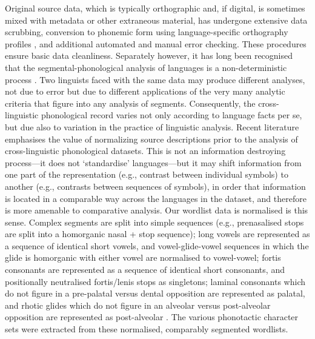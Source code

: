 Original source data, which is typically orthographic and, if digital, is sometimes mixed with metadata or other extraneous material, has undergone extensive data scrubbing, conversion to phonemic form using language-specific orthography profiles \autocite{moran_unicode_2018}, and additional automated and manual error checking. These procedures ensure basic data cleanliness. Separately however, it has long been recognised that the segmental-phonological analysis of languages is a non-deterministic process \autocites{chao_non-uniqueness_1934}{hockett_problem_1963}{hyman_universals_2008}{dresher_contrastive_2009}. Two linguists faced with the same data may produce different analyses, not due to error but due to different applications of the very many analytic criteria that figure into any analysis of segments. Consequently, the cross-linguistic phonological record varies not only according to language facts per se, but due also to variation in the practice of linguistic analysis. Recent literature \autocites{lass_vowel_1984}{hyman_universals_2008}{van_der_hulst_phonological_2017}{round_matthew_2017}{kiparsky_formal_2018} emphasises the value of normalizing source descriptions prior to the analysis of cross-linguistic phonological datasets. This is not an information destroying process---it does not `standardise' languages---but it may shift information from one part of the representation (e.g., contrast between individual symbols) to another (e.g., contrasts between sequences of symbols), in order that information is located in a comparable way across the languages in the dataset, and therefore is more amenable to comparative analysis. Our wordlist data is normalised is this sense. Complex segments are split into simple sequences (e.g., prenasalised stops are split into a homorganic nasal + stop sequence); long vowels are represented as a sequence of identical short vowels, and vowel-glide-vowel sequences in which the glide is homorganic with either vowel are normalised to vowel-vowel; fortis consonants are represented as a sequence of identical short consonants, and positionally neutralised fortis/lenis stops as singletons; laminal consonants which do not figure in a pre-palatal versus dental opposition are represented as palatal, and rhotic glides which do not figure in an alveolar versus post-alveolar opposition are represented as post-alveolar \autocites[see also][]{round_phonemic_2019}{round_australian_2019}. The various phonotactic character sets were extracted from these normalised, comparably segmented wordlists.

